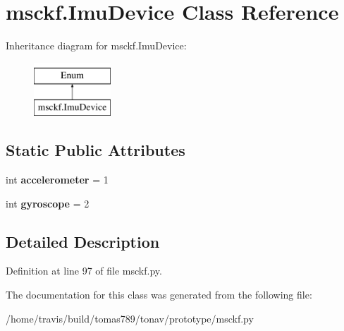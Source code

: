 \hypertarget{classmsckf_1_1_imu_device}{\section{msckf.\-Imu\-Device Class Reference}
\label{classmsckf_1_1_imu_device}
}
Inheritance diagram for msckf.\-Imu\-Device\-:\begin{figure}[H]
\begin{center}
\leavevmode
\includegraphics[height=2.000000cm]{classmsckf_1_1_imu_device}
\end{center}
\end{figure}
\subsection*{Static Public Attributes}
\begin{DoxyCompactItemize}
\item 
\hypertarget{classmsckf_1_1_imu_device_a3faeff4eaaf36e190287606fae61079f}{int {\bfseries accelerometer} = 1}\label{classmsckf_1_1_imu_device_a3faeff4eaaf36e190287606fae61079f}

\item 
\hypertarget{classmsckf_1_1_imu_device_acad284d6013b952fdd878b8a768e7169}{int {\bfseries gyroscope} = 2}\label{classmsckf_1_1_imu_device_acad284d6013b952fdd878b8a768e7169}

\end{DoxyCompactItemize}


\subsection{Detailed Description}


Definition at line 97 of file msckf.\-py.



The documentation for this class was generated from the following file\-:\begin{DoxyCompactItemize}
\item 
/home/travis/build/tomas789/tonav/prototype/msckf.\-py\end{DoxyCompactItemize}
